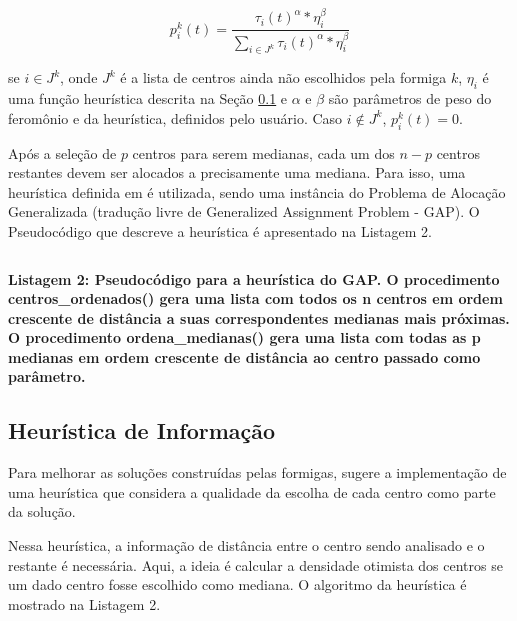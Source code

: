 \documentclass[12pt]{article}
\begin{document}
\begin{displaymath}
 p_i^k(t) = \frac{\tau_i(t)^\alpha * \eta_i ^ \beta}{\sum_{i \in J^k}^{} \tau_i(t)^\alpha * \eta_i^\beta}
\end{displaymath}

se $ i \in J^k $, onde $ J^k $ é a lista de centros ainda não escolhidos pela formiga $ k $, $ \eta_i $
é uma função heurística descrita na Seção \ref{sec:infheur} e $ \alpha $ e $ \beta $ são parâmetros de peso
do feromônio e da heurística, definidos pelo usuário. Caso $ i \notin J^k $, $ p_i^k(t) = 0 $.

Após a seleção de $ p $ centros para serem medianas, cada um dos $ n - p $ centros restantes devem ser alocados
a precisamente uma mediana. Para isso, uma heurística definida em \cite{DBLP:journals/informaticaSI/FrancaZC05}
é utilizada, sendo uma instância do Problema de Alocação Generalizada (tradução livre de Generalized Assignment
Problem - GAP). O Pseudocódigo que descreve a heurística é apresentado na Listagem 2.\\

\begin{mdframed}[linecolor=black, leftline=false, rightline=false]
    \inputminted[linenos, fontsize=\footnotesize]{text}{gap.txt}
\end{mdframed}

\begin{center}
 \textbf{Listagem 2: Pseudocódigo para a heurística do GAP. O procedimento centros\_ordenados() gera uma lista
 com todos os n centros em ordem crescente de distância a suas correspondentes medianas mais próximas. O procedimento
 ordena\_medianas() gera uma lista com todas as p medianas em ordem crescente de distância ao centro passado
 como parâmetro.}
\end{center}

\subsection{Heurística de Informação} \label{sec:infheur}

Para melhorar as soluções construídas pelas formigas, \cite{DBLP:journals/informaticaSI/FrancaZC05} sugere
a implementação de uma heurística que considera a qualidade da escolha de cada centro como parte da solução.

Nessa heurística, a informação de distância entre o centro sendo analisado e o restante é necessária. Aqui,
a ideia é calcular a densidade otimista dos centros se um dado centro fosse escolhido como mediana. O algoritmo
da heurística é mostrado na Listagem 2.\\
\end{document}
